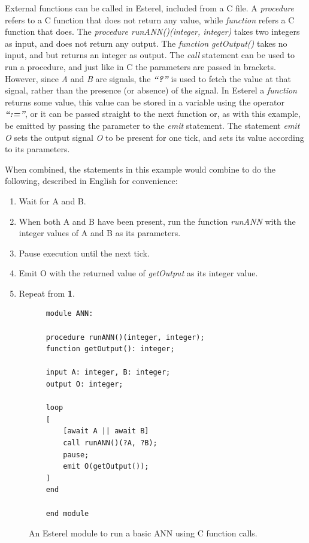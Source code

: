 External functions can be called in Esterel, included from a C file.
A \textit{procedure} refers to a C function that does not return any value, while \textit{function} refers a C function that does.
The \textit{procedure runANN()(integer, integer)} takes two integers as input, and does not return any output.
The \textit{function getOutput()} takes no input, and but returns an integer as output.
The \textit{call} statement can be used to run a procedure, and just like in C the parameters are passed in brackets.
However, since \textit{A} and \textit{B} are signals, the \textbf{\emph{``?''}} is used to fetch the value at that signal, rather than the presence (or absence) of the signal.
In Esterel a \textit{function} returns some value, this value can be stored in a variable using the operator \textbf{\emph{``:=''}}, or it can be passed straight to the next function or, as with this example, be emitted by passing the parameter to the \textit{emit} statement.
The statement \textit{emit O} sets the output signal \textit{O} to be present for one tick, and sets its value according to its parameters.

When combined, the statements in this example would combine to do the following, described in English for convenience:
\begin{enumerate}
	\item Wait for A and B. 
	\item When both A and B have been present, run the function \textit{runANN} with the integer values of A and B as its parameters.
	\item Pause execution until the next tick.
	\item Emit O with the returned value of \textit{getOutput} as its integer value.
	\item Repeat from \textbf{1}.
\end{enumerate}

\begin{figure}[h]
	\begin{lstlisting}
	module ANN:
	
	procedure runANN()(integer, integer);
	function getOutput(): integer;
	
	input A: integer, B: integer;
	output O: integer;
	
	loop
	[
		[await A || await B] 
		call runANN()(?A, ?B);
		pause;
		emit O(getOutput());
	]
	end
	
	end module
	\end{lstlisting}
	\caption{An Esterel module to run a basic \ac{ANN} using C function calls.}
	\label{fig:esterel-abro}
\end{figure}

